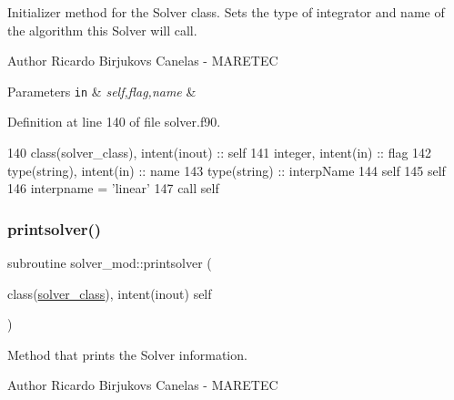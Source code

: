 Initializer method for the Solver class. Sets the type of integrator and name of the algorithm this Solver will call. 

\begin{DoxyAuthor}{Author}
Ricardo Birjukovs Canelas -\/ M\+A\+R\+E\+T\+EC 
\end{DoxyAuthor}

\begin{DoxyParams}[1]{Parameters}
\mbox{\tt in}  & {\em self,flag,name} & \\
\hline
\end{DoxyParams}


Definition at line 140 of file solver.\+f90.


\begin{DoxyCode}
140     \textcolor{keywordtype}{class}(solver\_class), \textcolor{keywordtype}{intent(inout)} :: self
141     \textcolor{keywordtype}{integer}, \textcolor{keywordtype}{intent(in)} :: flag
142     \textcolor{keywordtype}{type}(string), \textcolor{keywordtype}{intent(in)} :: name
143     \textcolor{keywordtype}{type}(string) :: interpName
144     self%
145     self%
146     interpname = \textcolor{stringliteral}{'linear'}
147     \textcolor{keyword}{call }self%
\end{DoxyCode}
\mbox{\label{namespacesolver__mod_a54ea6899cce026a7a5da2dd05922628f}} 
\subsubsection{\texorpdfstring{printsolver()}{printsolver()}}
{\footnotesize\ttfamily subroutine solver\+\_\+mod\+::printsolver (\begin{DoxyParamCaption}\item[{class(\mbox{\hyperlink{structsolver__mod_1_1solver__class}{solver\+\_\+class}}), intent(inout)}]{self }\end{DoxyParamCaption})\hspace{0.3cm}{\ttfamily [private]}}



Method that prints the Solver information. 

\begin{DoxyAuthor}{Author}
Ricardo Birjukovs Canelas -\/ M\+A\+R\+E\+T\+EC 
\end{DoxyAuthor}


